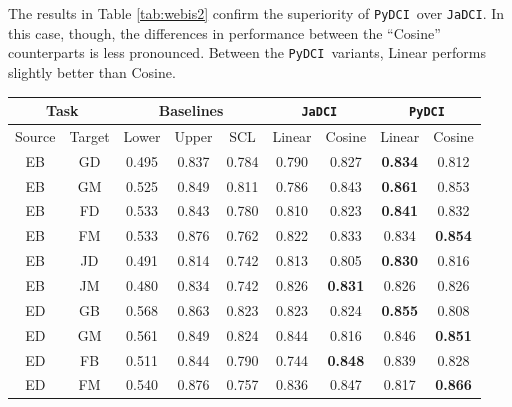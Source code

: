 \documentclass{article}
\newcommand{\jadci}{\texttt{JaDCI}}
\newcommand{\pydci}{\texttt{PyDCI}}
\begin{document}
The results in Table \ref{tab:webis2} confirm the superiority of
\pydci\ over \jadci. In this case, though, the differences in
performance between the ``Cosine'' counterparts is less pronounced.
Between the \pydci\ variants, Linear performs slightly better than
Cosine.

\begin{table}[ht!]
  \centering
  \begin{tabular}{|c|c||c|c|c||c|c||c|c|}
    \hline
    \multicolumn{2}{|c||}{Task} & \multicolumn{3}{c||}{Baselines} & \multicolumn{2}{c||}{\jadci} & \multicolumn{2}{c|}{\pydci}       \\ \hline
    Source     & Target      & Lower         & Upper         & SCL %
    & Linear   & Cosine          & Linear         & Cosine         \\\hline\hline
    EB         & GD          & 0.495         & 0.837         & 0.784 & 0.790    & 0.827           & \textbf{0.834} & 0.812          \\
    EB         & GM          & 0.525         & 0.849         & 0.811 & 0.786    & 0.843           & \textbf{0.861} & 0.853          \\
    EB         & FD          & 0.533         & 0.843         & 0.780 & 0.810    & 0.823           & \textbf{0.841} & 0.832          \\
    EB         & FM          & 0.533         & 0.876         & 0.762 & 0.822    & 0.833           & 0.834          & \textbf{0.854} \\
    EB         & JD          & 0.491         & 0.814         & 0.742 & 0.813    & 0.805           & \textbf{0.830} & 0.816          \\
    EB         & JM          & 0.480         & 0.834         & 0.742 & 0.826    & \textbf{0.831}  & 0.826          & 0.826          \\ \hline
    ED         & GB          & 0.568         & 0.863         & 0.823 & 0.823    & 0.824           & \textbf{0.855} & 0.808          \\
    ED         & GM          & 0.561         & 0.849         & 0.824 & 0.844    & 0.816           & 0.846          & \textbf{0.851} \\
    ED         & FB          & 0.511         & 0.844         & 0.790 & 0.744    & \textbf{0.848}  & 0.839          & 0.828          \\
    ED         & FM          & 0.540         & 0.876         & 0.757 & 0.836    & 0.847           & 0.817          & \textbf{0.866} \\

\end{tabular}
\end{table}
\end{document}
